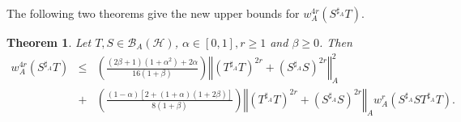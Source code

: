\documentclass{article}
\newcommand{\bra}[1]{\left(#1\right)}
\newcommand{\sbra}[1]{\left[#1\right]}
\newcommand{\normA}[1]{{\left\Vert#1\right\Vert}_{A}}
\newcommand {\Sa}{S^{\sharp_{A}}}
\newcommand {\h}{\mathcal{H}}
\newcommand {\Ta}{T^{\sharp_{A}}}
\renewcommand {\b}{\mathcal{B}}
\newtheorem{theorem}{Theorem}[section]
\begin{document}
The following two theorems give the new upper bounds for $w_A^{4r}(\Sa T)$.
\begin{theorem} Let $T,S\in\b_A(\h)$, $\alpha\in [0,1],r\geq 1$ and $\beta\geq 0$. Then
\begin{eqnarray*}
  w_A^{4r} (\Sa T)&\leq& \bra{\frac{(2\beta+1)(1+\alpha^2)+2\alpha}{16(1+\beta)}}\normA{\bra{\Ta T}^{2r}+\bra{\Sa S}^{2r}}^2\nonumber\\
   &+& \bra{\frac{\bra{1-\alpha}\sbra{2+(1+\alpha)(1+2\beta)}}{8(1+\beta)}}\normA{\bra{\Ta T}^{2r}+\bra{\Sa S}^{2r}}w_A^{r}(\Sa S\Ta T).
\end{eqnarray*}
\end{theorem}
\end{document}
